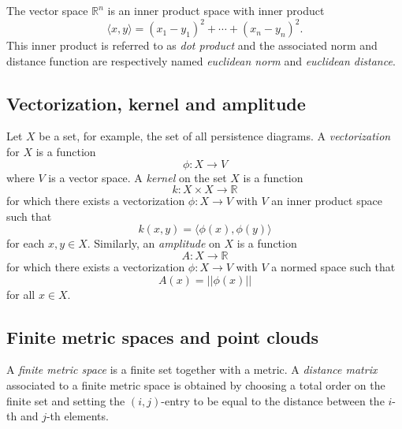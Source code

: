 \documentclass{amsart}
\begin{document}
	The vector space $\mathbb R^n$ is an 
	inner product space with inner product 
	\begin{equation*}
	\langle x, y \rangle = (x_1-y_1)^2 + \cdots + (x_n-y_n)^2.
	\end{equation*}
	This inner product is referred to as \textit{dot product} and the associated norm and distance function are respectively named \textit{euclidean norm} and \textit{euclidean distance}.	
	
	\subsection*{Vectorization, kernel and amplitude} \label{vectorization_kernel_and_amplitude}	
	
	Let $X$ be a set, for example, the set of all
	persistence diagrams. A \textit{vectorization} for $X$ is a function	
	\begin{equation*}	
	\phi : X \to V	
	\end{equation*}	
	where $V$ is a vector space. A \textit{kernel} on the set $X$ is a function	
	\begin{equation*}	
	k : X \times X \to \mathbb R	
	\end{equation*}	
	for which there exists a vectorization $\phi : X \to V$ with $V$ an
	inner product space such that	
	\begin{equation*}	
	k(x,y) = \langle \phi(x), \phi(y) \rangle	
	\end{equation*}	
	for each $x,y \in X$. Similarly, an \textit{amplitude} on $X$ is a function	
	\begin{equation*}	
	A : X \to \mathbb R	
	\end{equation*}	
	for which there exists a vectorization $\phi : X \to V$ with $V$ a
	normed space such that	
	\begin{equation*}	
	A(x) = ||\phi(x)||	
	\end{equation*}	
	for all $x \in X$.
	
	\subsection*{Finite metric spaces and point clouds} \label{finite_metric_spaces_and_point_clouds}
	
	A \textit{finite metric space} is a finite set together with a 
	metric. A \textit{distance matrix} associated to a finite metric space is obtained by choosing a total order on the finite set and setting the $(i,j)$-entry to be equal to the distance between the $i$-th and $j$-th elements. 
	
\end{document}
